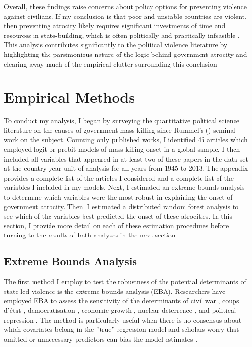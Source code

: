 \documentclass[a4paper,12pt]{article}
\begin{document}
Overall, these findings raise concerns about policy options for preventing violence against civilians. If my conclusion is that poor and unstable countries are violent, then preventing atrocity likely requires significant investments of time and resources in state-building, which is often politically and practically infeasible \citep{doyle2006making}.  This analysis contributes significantly to the political violence literature by highlighting the parsimonious nature of the logic behind government atrocity and clearing away much of the empirical clutter surrounding this conclusion. 
	
\section{Empirical Methods}
\label{sec:methods}
	
To conduct my analysis, I began by surveying the quantitative political science literature on the causes of government mass killing since Rummel's (\citeyear{rummel1995democracy}) seminal work on the subject. Counting only published works, I identified 45 articles which employed logit or probit models of mass killing onset in a global sample. I then included all variables that appeared in at least two of these papers in the data set at the country-year unit of analysis for all years from 1945 to 2013. The appendix provides a complete list of the articles I considered and a complete list of the variables I included in my models. Next, I estimated an extreme bounds analysis to determine which variables were the most robust in explaining the onset of government atrocity. Then, I estimated a distributed random forest analysis to see which of the variables best predicted the onset of these atrocities. In this section, I provide more detail on each of these estimation procedures before turning to the results of both analyses in the next section.

\subsection{Extreme Bounds Analysis}
\label{subsec:eba}

The first method I employ to test the robustness of the potential determinants of state-led violence is the extreme bounds analysis (EBA). Researchers have employed EBA to assess the sensitivity of the determinants of civil war \citep{hegre2006sensitivity}, coups d'état \citep{gassebner2016expect}, democratisation \citep{gassebner2013extreme}, economic growth \citep{levine1992sensitivity, sala1997just}, nuclear deterrence \citep{bell2015examining}, and political repression \citep{hafner2005right}. The method is particularly useful when there is no consensus about which covariates belong in the ``true'' regression model \citep[178]{sala1997just} and scholars worry that omitted or unnecessary predictors can bias the model estimates \citep[60]{angrist2008mostly, clarke2005phantom, elwert2014endogenous, spector2011methodological}.
\end{document}
